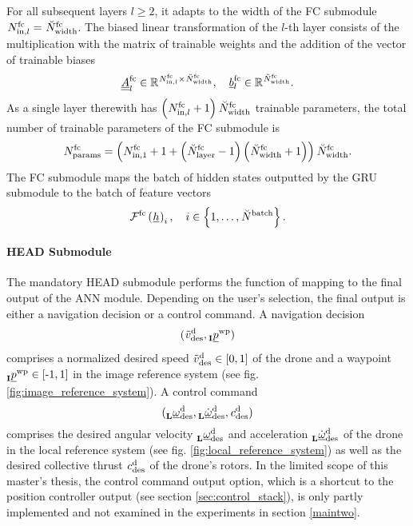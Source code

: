 For all subsequent layers $l \ge 2$,
it adapts to the width of the FC submodule $ \fcIn{l} = \fcOut$.
The biased linear transformation of the $l$-th layer
consists of the multiplication with the matrix of trainable weights
and the addition of the vector of trainable biases
\begin{equation}
    \fcMat{l} \in \R{\fcIn{l} \times \fcOut}
    , \quad
    \fcBias{l} \in \R{\fcOut}
    .
\end{equation}
As a single layer therewith has $\tuple{\fcIn{l} + 1} \fcOut$
trainable parameters,
the total number of trainable parameters of the FC submodule is
\begin{align} \label{eq:fc_param}
    \fcParam = \tuple{
        \fcIn{1} + 1 + 
        \tuple{\fcLayer -1} \tuple{\fcOut +1}
    } \fcOut
    .
\end{align}
The FC submodule maps
the batch of hidden states
outputted by the GRU submodule
to the batch of feature vectors
\begin{equation}
    \fcMap{} \tuple{\hiddenstate[]{}{}{}{}}_i
    , \quad
    i \in \setOfInts{1, \dots, \batchSize}
    .
\end{equation}






\paragraph*{HEAD Submodule}$\ $\\
The mandatory HEAD submodule
performs the function of mapping
to the final output of the ANN module.
Depending on the user's selection,
the final output is either a navigation decision or a control command.
A navigation decision 
\begin{equation} \label{eq:head_nav_dec}
    \headNavDec
\end{equation}
comprises a normalized desired speed 
$\normDesSpeed \in \setR{0,1}$
of the drone
and a waypoint
$\waypIRS \in \setR{\text{-}1,1}$
in the image reference system
(see fig. \ref{fig:image_reference_system}).
A control command 
\begin{equation} \label{eq:head_ctrl_cmd}
    \headCtrlCmd
\end{equation}
comprises the desired angular velocity
$\desAngVel$
and acceleration
$\desAngAcc$
of the drone in the local reference system 
(see fig. \ref{fig:local_reference_system})
as well as the desired collective thrust 
$\desColThrust$
of the drone's rotors.
In the limited scope of this master's thesis,
the control command output option,
which is a shortcut to the position controller output 
(see section \ref{sec:control_stack}),
is only partly implemented and 
not examined in the experiments in section \ref{maintwo}.

